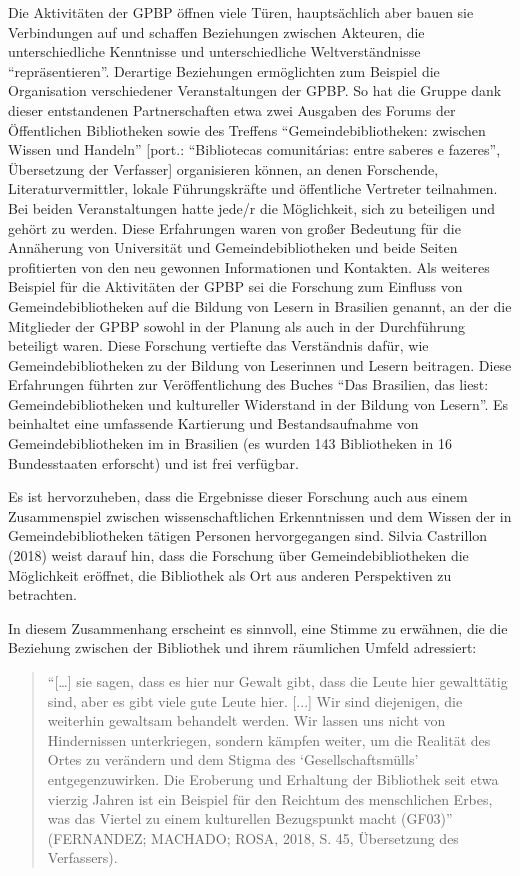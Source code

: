 \documentclass[a4paper,
fontsize=11pt,
oneside,
numbers=noperiodatend,
parskip=half-,
bibliography=totoc,
final
]{scrartcl}
\begin{document}
Die Aktivitäten der GPBP öffnen viele Türen, hauptsächlich aber bauen
sie Verbindungen auf und schaffen Beziehungen zwischen Akteuren, die
unterschiedliche Kenntnisse und unterschiedliche Weltverständnisse
\enquote{repräsentieren}. Derartige Beziehungen ermöglichten zum
Beispiel die Organisation verschiedener Veranstaltungen der GPBP. So hat
die Gruppe dank dieser entstandenen Partnerschaften etwa zwei Ausgaben
des Forums der Öffentlichen Bibliotheken sowie des Treffens
\enquote{Gemeindebibliotheken: zwischen Wissen und Handeln} {[}port.:
\enquote{Bibliotecas comunitárias: entre saberes e fazeres}, Übersetzung
der Verfasser{]} organisieren können, an denen Forschende,
Literaturvermittler, lokale Führungskräfte und öffentliche Vertreter
teilnahmen. Bei beiden Veranstaltungen hatte jede/r die Möglichkeit,
sich zu beteiligen und gehört zu werden. Diese Erfahrungen waren von
großer Bedeutung für die Annäherung von Universität und
Gemeindebibliotheken und beide Seiten profitierten von den neu gewonnen
Informationen und Kontakten. Als weiteres Beispiel für die Aktivitäten
der GPBP sei die Forschung zum Einfluss von Gemeindebibliotheken auf die
Bildung von Lesern in Brasilien genannt, an der die Mitglieder der GPBP
sowohl in der Planung als auch in der Durchführung beteiligt waren.
Diese Forschung vertiefte das Verständnis dafür, wie
Gemeindebibliotheken zu der Bildung von Leserinnen und Lesern beitragen.
Diese Erfahrungen führten zur Veröffentlichung des Buches \enquote{Das
Brasilien, das liest: Gemeindebibliotheken und kultureller Widerstand in
der Bildung von Lesern}. Es beinhaltet eine umfassende Kartierung und
Bestandsaufnahme von Gemeindebibliotheken im in Brasilien (es wurden 143
Bibliotheken in 16 Bundesstaaten erforscht) und ist frei verfügbar.

Es ist hervorzuheben, dass die Ergebnisse dieser Forschung auch aus
einem Zusammenspiel zwischen wissenschaftlichen Erkenntnissen und dem
Wissen der in Gemeindebibliotheken tätigen Personen hervorgegangen sind.
Silvia Castrillon (2018) weist darauf hin, dass die Forschung über
Gemeindebibliotheken die Möglichkeit eröffnet, die Bibliothek als Ort
aus anderen Perspektiven zu betrachten.

In diesem Zusammenhang erscheint es sinnvoll, eine Stimme zu erwähnen,
die die Beziehung zwischen der Bibliothek und ihrem räumlichen Umfeld
adressiert:

\begin{quote}
\enquote{{[}\ldots{]} sie sagen, dass es hier nur Gewalt gibt, dass die
Leute hier gewalttätig sind, aber es gibt viele gute Leute hier.
{[}...{]} Wir sind diejenigen, die weiterhin gewaltsam behandelt werden.
Wir lassen uns nicht von Hindernissen unterkriegen, sondern kämpfen
weiter, um die Realität des Ortes zu verändern und dem Stigma
des \enquote{Gesellschaftsmülls} entgegenzuwirken. Die Eroberung und Erhaltung
der Bibliothek seit etwa vierzig Jahren ist ein Beispiel für den
Reichtum des menschlichen Erbes, was das Viertel zu einem kulturellen
Bezugspunkt macht (GF03)} (FERNANDEZ; MACHADO; ROSA, 2018, S. 45,
Übersetzung des Verfassers).
\end{quote}
\end{document}
